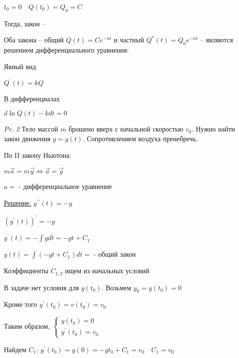 \documentclass[12pt]{article}
\begin{document}
    $t_0 = 0 \quad Q(t_0) = Q_0 = C$

    Тогда, закон -- 

    \Nota Оба закона -- общий $Q(t) = Ce^{-nt}$ и частный $Q^*(t) = Q_0 e^{-nt}$ --
    являются решением дифференциального уравнения:

    \begin{multicols}{2}
        \begin{center}
        Явный вид

        $Q^\prime(t) = kQ$

        В дифференциалах

        $d \ln Q(t) - kdt = 0$
        \end{center}
    \end{multicols}

    \vspace{5mm}

    \hypertarget{freefallingbodyproblem}{}

    \begin{tcolorbox}
        \textit{Pr. 2} \quad Тело массой $m$ брошено вверх с начальной скоростью $v_0$. Нужно найти закон движения $y = y(t)$.
        Сопротивлением воздуха пренебречь.
    \end{tcolorbox}

    По II закону Ньютона:

    $m\vec{a} = m\vec{g} \Longleftrightarrow \vec{a} = \vec{g}$

    $a = $ - дифференциальное уравнение

    \underline{Решение.} \quad $y^{\prime\prime}(t) = -g$

    $(y^{\prime}(t))^\prime = -g$

    $y^{\prime}(t) = -\int g dt = -gt + C_1$

    $y(t) = \int (-gt + C_1) dt = $ - общий закон

    Коэффициенты $C_{1,2}$ ищем из начальных условий

    В задаче нет условия для $y(t_0)$. Возьмем $y_0 = y(t_0) = 0$

    Кроме того $y^\prime(t_0) = v(t_0) = v_0$

    Таким образом, $\begin{cases}y(t_0) = 0 \\ y^\prime(t_0) = v_0\end{cases}$

    Найдем $C_1$: $y^\prime(t_0) = y(0) = -gt_0 + C_1 = v_0 \quad C_1 = v_0$
\end{document}
